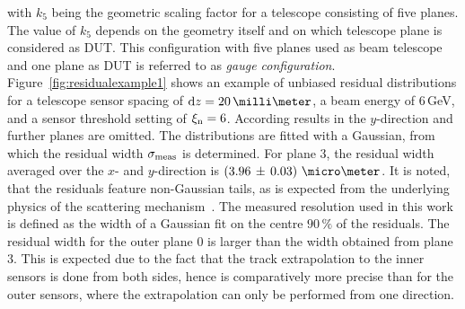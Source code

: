 \noindent
with $k_5$ being the geometric scaling factor for a telescope consisting of five planes. 
The value of $k_5$ depends on the geometry itself and on which telescope plane is considered as DUT. 
This configuration with five planes used as beam telescope and one plane as DUT is referred to as \textit{gauge configuration}. 
Figure~\ref{fig:residualexample1} shows an example of unbiased residual distributions for a telescope sensor spacing of $\dz = 20\,\milli\meter$,
 a beam energy of 6\,GeV, and a sensor threshold setting of $\xi_{\textrm{n}} = 6$. 
According results in the $y$-direction and further planes are omitted. 
The distributions are fitted with a Gaussian, from which the residual width $\sigma_{\textrm{meas}}$ is determined. 
For plane $3$, the residual width averaged over the $x$- and $y$-direction is $\left( 3.96\,\pm\, \allowbreak 0.03 \right)\,\micro\meter$. 
It is noted, that the residuals feature non-Gaussian tails, as is expected from the underlying physics of the scattering mechanism~\cite{ref:PDG-2014}. 
The measured resolution used in this work is defined as the width of a Gaussian fit on the centre $90\,\%$ of the residuals. 
The residual width for the outer plane $0$ is larger than the width obtained from plane $3$.
This is expected due to the fact that the track extrapolation to the inner sensors is done from both sides, hence is comparatively more precise than for the outer sensors,
 where the extrapolation can only be performed from one direction. 

% 

